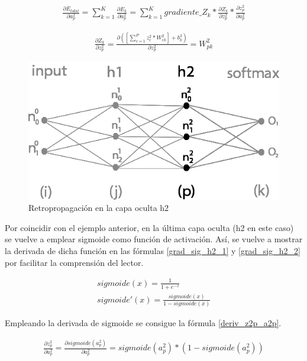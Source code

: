 \begin{gather}
	\frac{\partial E_{total}}{\partial a^2_p} = \sum_{k=1}^K \frac{\partial E_k}{\partial a^2_p} = \sum_{k=1}^K  gradiente\_Z_k * \frac{\partial Z_k}{\partial z^2_p} * \frac{\partial z^2_p}{\partial a^2_p}
	\label{E_total_a2p}
\end{gather}

\begin{gather}
	\frac{\partial Z_k}{\partial z^2_p} = \frac{\partial( [\sum_{c=1}^{P} z^2_c * W^2_{ck}] + b^3_k)}{\partial z^2_p} = W^2_{pk}
	\label{deriv_Zk_z2p}
\end{gather}

\begin{figure}[H]
	\centering
	\includegraphics[scale=0.35]{imagenes/nn_2_capa_h2.jpg}  
	\caption{Retropropagación en la capa oculta h2}
	\label{fig:nn_2_capa_h2}
\end{figure}

Por coincidir con el ejemplo anterior, en la última capa oculta (h2 en este caso) se vuelve a emplear sigmoide como función de activación. Así, se vuelve a mostrar la derivada de dicha función en las fórmulas \ref{grad_sig_h2_1} y \ref{grad_sig_h2_2} por facilitar la comprensión del lector.

\begin{gather}
	sigmoide(x) = \frac{1}{1+e^{-x}} \label{grad_sig_h2_1} \\
	sigmoide'(x) = \frac{sigmoide(x)}{1-sigmoide(x)} \label{grad_sig_h2_2}
\end{gather}


Empleando la derivada de sigmoide se consigue la fórmula \ref{deriv_z2p_a2p}.

\begin{gather}
	\frac{\partial z^2_ p}{\partial a^2_p} = \frac{\partial sigmoide(a^2_p)}{\partial a^2_p} = sigmoide(a^2_p)*(1-sigmoide(a^2_p))
	\label{deriv_z2p_a2p}
\end{gather}

